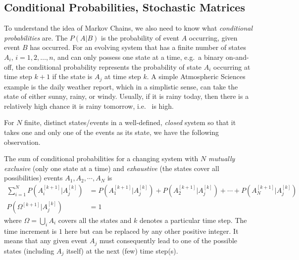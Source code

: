\subsection{Conditional Probabilities, Stochastic Matrices}
To understand the idea of Markov Chains, we also need to know what \textit{conditional probabilities} are. The  $P(A|B)$ is the probability of event $A$ occurring, given event $B$ has occurred. For an evolving system that has a finite number of states $A_i$, $i = 1,2,\ldots,n$, and can only possess one state at a time, e.g.\ a binary on-and-off, the conditional probability  represents the probability of state $A_i$ occurring at time step $k+1$ if the state is $A_j$ at time step $k$. A simple Atmospheric Sciences example is the daily weather report, which in a simplistic sense, can take the state of either sunny, rainy, or windy. Usually, if it is rainy today, then there is a relatively high chance it is rainy tomorrow, i.e.\  is high. \par
For $N$ finite, distinct states/events in a well-defined, \textit{closed} system so that it takes one and only one of the events as its state, we have the following observation.
\begin{proper}
\label{proper:condprobsumto1}
The sum of conditional probabilities for a changing system with $N$ \textit{mutually exclusive} (only one state at a time) and \textit{exhaustive} (the states cover all possibilities) events $A_1, A_2, \cdots, A_N$ is
\begin{align}
\sum_{i=1}^N P(A_i^{[k+1]}|A_j^{[k]}) &= P(A_1^{[k+1]}|A_j^{[k]}) + P(A_2^{[k+1]}|A_j^{[k]}) + \cdots + P(A_N^{[k+1]}|A_j^{[k]}) \nonumber \\
P(\Omega^{[k+1]}|A_j^{[k]}) &= 1
\end{align}
where $\Omega = \bigcup_{i} A_i$ covers all the states and $k$ denotes a particular time step. The time increment is $1$ here but can be replaced by any other positive integer. It means that any given event $A_j$ must consequently lead to one of the possible states (including $A_j$ itself) at the next (few) time step(s).
\end{proper}
